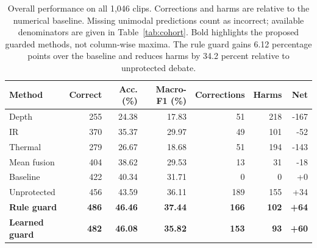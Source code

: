 \begin{table}[pos=t]
\caption{Overall performance on all 1,046 clips. Corrections and harms are relative to the numerical baseline. Missing unimodal predictions count as incorrect; available denominators are given in Table~\ref{tab:cohort}. Bold highlights the proposed guarded methods, not column-wise maxima. The rule guard gains 6.12 percentage points over the baseline and reduces harms by 34.2 percent relative to unprotected debate.}
\label{tab:results_main}
\centering\small
\begin{tabular}{@{}lrrrrrr@{}}
\toprule
Method & Correct & Acc. (\%) & Macro-F1 (\%) & Corrections & Harms & Net \\
\midrule
Depth & 255 & 24.38 & 17.83 & 51 & 218 & -167 \\
IR & 370 & 35.37 & 29.97 & 49 & 101 & -52 \\
Thermal & 279 & 26.67 & 18.68 & 51 & 194 & -143 \\
Mean fusion & 404 & 38.62 & 29.53 & 13 & 31 & -18 \\
Baseline & 422 & 40.34 & 31.71 & 0 & 0 & +0 \\
Unprotected & 456 & 43.59 & 36.11 & 189 & 155 & +34 \\
\textbf{Rule guard} & \textbf{486} & \textbf{46.46} & \textbf{37.44} & \textbf{166} & \textbf{102} & \textbf{+64} \\
\textbf{Learned guard} & \textbf{482} & \textbf{46.08} & \textbf{35.82} & \textbf{153} & \textbf{93} & \textbf{+60} \\
\bottomrule
\end{tabular}
\end{table}

